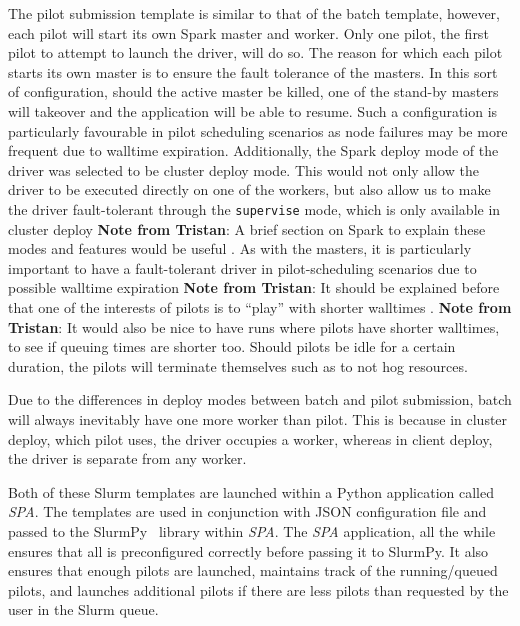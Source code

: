\documentclass{IEEEtran}
\newcommand{\tristan}[1]{\color{red}\textbf{Note from Tristan}:
      #1 \color{black}}
\newcommand{\TG}[1]{\tristan{#1}}
\begin{document}
    The pilot submission template is similar to that of the batch template, however,
    each pilot will start its own Spark master and worker. Only one pilot,
    the first pilot to attempt to launch the driver, will do so. The reason for 
    which each pilot starts its own master is to ensure the fault tolerance of the 
    masters. In this sort of configuration, should the active master be killed, one
    of the stand-by masters will takeover and the application will be able to 
    resume. Such a configuration is particularly favourable in pilot scheduling 
    scenarios as node failures may be more frequent due to walltime expiration.
    Additionally, the Spark deploy mode of the driver was selected to be cluster deploy mode.
    This would not only allow the driver to be executed directly on one of the workers,
    but also allow us to make the driver fault-tolerant through the
    \texttt{supervise} mode, which is only available in cluster deploy
    \TG{A brief section on Spark to explain these modes and features would
    be useful}. As with the masters, it is particularly important to have a
    fault-tolerant driver in pilot-scheduling scenarios due to possible
    walltime expiration \TG{It should be explained before that one of the interests of pilots
    is to ``play'' with shorter walltimes}. \TG{It would also be nice to have runs where pilots 
    have shorter walltimes, to see if queuing times are shorter too.}
    Should pilots be idle for a certain duration, the
    pilots will terminate themselves such as to not hog resources.
    
    Due to the differences in deploy modes between batch and pilot submission, 
    batch will always inevitably have one more worker than pilot. This is because
    in cluster deploy, which pilot uses, the driver occupies a worker, whereas in
    client deploy, the driver is separate from any worker.

    Both of these Slurm templates are launched within a Python application called
    \textit{SPA}. The templates are used in conjunction with JSON configuration 
    file and passed to the SlurmPy~\cite{slurmpy} library within \textit{SPA}.
    The \textit{SPA} application, all the while ensures that all is preconfigured
    correctly before passing it to SlurmPy. It also ensures that enough pilots are
    launched, maintains track of the running/queued pilots, and launches additional
    pilots if there are less pilots than requested by the user in the Slurm queue.
\end{document}

